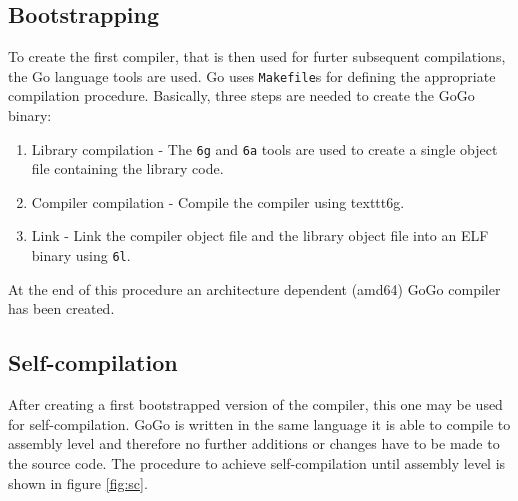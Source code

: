 \documentclass[a4paper]{scrartcl}
\let\section\subsection
\let\subsection\subsubsection
\let\subsubsection\paragraph
\let\paragraph\subparagraph
\let\subparagraph\undefined
\begin{document}
    \section{Bootstrapping}
      To create the first compiler, that is then used for furter subsequent 
      compilations, the Go language tools are used. Go uses \texttt{Makefile}s 
      for defining the appropriate compilation procedure. Basically, three steps 
      are needed to create the GoGo binary:      
      \begin{enumerate}
        \item Library compilation - The \texttt{6g} and \texttt{6a} tools are
          used to create a single object file containing the library code.
        \item Compiler compilation - Compile the compiler using texttt{6g}.
        \item Link - Link the compiler object file and the library object file
          into an ELF binary using \texttt{6l}.
      \end{enumerate}
      At the end of this procedure an architecture dependent (amd64) GoGo
     compiler has been created.

    \section{Self-compilation}
    \label{sec:sc}
      After creating a first bootstrapped version of the compiler, this one may
      be used for self-compilation. GoGo is written in the same language it 
      is able to compile to assembly level and therefore no further additions
      or changes have to be made to the source code.
      The procedure to achieve self-compilation until assembly level is shown
      in figure \ref{fig:sc}.
\end{document}
